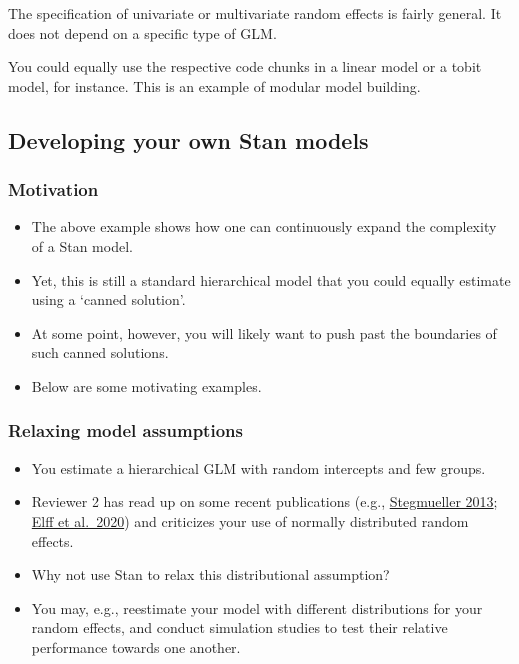 \documentclass[
  11pt,
]{article}
\providecommand{\tightlist}{%
  \setlength{\itemsep}{0pt}\setlength{\parskip}{0pt}}
\begin{document}
The specification of univariate or multivariate random effects is fairly general. It does not depend on a specific type of GLM.

You could equally use the respective code chunks in a linear model or a tobit model, for instance. This is an example of modular model building.

\hypertarget{developing-your-own-stan-models}{%
\subsection{Developing your own Stan models}\label{developing-your-own-stan-models}}

\hypertarget{motivation}{%
\subsubsection{Motivation}\label{motivation}}

\begin{itemize}
\tightlist
\item
  The above example shows how one can continuously expand the complexity of a Stan model.
\item
  Yet, this is still a standard hierarchical model that you could equally estimate using a `canned solution'.
\item
  At some point, however, you will likely want to push past the boundaries of such canned solutions.
\item
  Below are some motivating examples.
\end{itemize}

\hypertarget{relaxing-model-assumptions}{%
\subsubsection{Relaxing model assumptions}\label{relaxing-model-assumptions}}

\begin{itemize}
\tightlist
\item
  You estimate a hierarchical GLM with random intercepts and few groups.
\item
  Reviewer 2 has read up on some recent publications (e.g., \href{https://onlinelibrary.wiley.com/doi/full/10.1111/ajps.12001}{Stegmueller 2013}; \href{https://www.elff.eu/article/multilevel-improving/}{Elff et al.~2020}) and criticizes your use of normally distributed random effects.
\item
  Why not use Stan to relax this distributional assumption?
\item
  You may, e.g., reestimate your model with different distributions for your random effects, and conduct simulation studies to test their relative performance towards one another.
\end{itemize}
\end{document}
